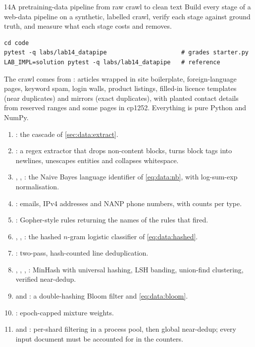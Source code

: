 \begin{labbox}{14}{A pretraining-data pipeline from raw crawl to clean text}
Build every stage of a web-data pipeline on a synthetic, labelled crawl, verify each stage
against ground truth, and measure what each stage costs and removes.

\begin{lstlisting}[style=shell]
cd code
pytest -q labs/lab14_datapipe                     # grades starter.py
LAB_IMPL=solution pytest -q labs/lab14_datapipe   # reference
\end{lstlisting}
The crawl comes from : articles wrapped in site boilerplate, foreign-language
pages, keyword spam, login walls, product listings, filled-in licence templates (near duplicates)
and mirrors (exact duplicates), with planted contact details from reserved ranges and some pages in
cp1252. Everything is pure Python and NumPy.

\begin{enumerate}
  \item {}: the cascade of \cref{sec:data:extract}.
  \item {}: a regex extractor that drops non-content blocks, turns block tags into
        newlines, unescapes entities and collapses whitespace.
  \item {}, , : the Naive Bayes
        language identifier of \cref{eq:data:nb}, with log-sum-exp normalisation.
  \item {}: emails, IPv4 addresses and NANP phone numbers, with counts per type.
  \item {}: Gopher-style rules returning the names of the rules that fired.
  \item {}, , : the hashed $n$-gram
        logistic classifier of \cref{eq:data:hashed}.
  \item {}: two-pass, hash-counted line deduplication.
  \item {}, , , :
        MinHash with universal hashing, LSH banding, union-find clustering, verified near-dedup.
  \item {} and : a double-hashing Bloom filter and \cref{eq:data:bloom}.
  \item {}: epoch-capped mixture weights.
  \item {} and : per-shard filtering in a process pool,
        then global near-dedup; every input document must be accounted for in the counters.
\end{enumerate}


\end{labbox}
